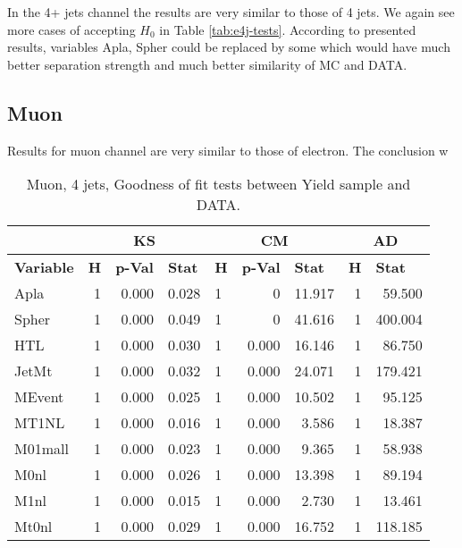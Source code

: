 In the 4+ jets channel the results are very similar to those of 4 jets. We again see more cases of accepting $H_0$ in Table \ref{tab:e4j-tests}. According to presented results, variables \textsf{Apla, Spher} could be replaced by some which would have much better separation strength and much better similarity of MC and DATA. 

\subsection{Muon}

Results for muon channel are very similar to those of electron. The conclusion w

\begin{table}[htbp] \footnotesize
\caption{Muon, 4 jets, Goodness of fit tests between Yield sample and DATA.}
\begin{center}
\begin{tabular}{|l|r|r|r|l|r|r|r|r|}
\hline
 & \multicolumn{ 3}{c|}{\textbf{KS}} & \multicolumn{ 3}{c|}{\textbf{CM}} & \multicolumn{ 2}{c|}{\textbf{AD}} \\ \hline
\textbf{Variable} & \multicolumn{1}{l|}{\textbf{H}} & \multicolumn{1}{l|}{\textbf{p-Val}} & \multicolumn{1}{l|}{\textbf{Stat}} & \multicolumn{1}{l|}{\textbf{H}} & \multicolumn{1}{l|}{\textbf{p-Val}} & \multicolumn{1}{l|}{\textbf{Stat}} & \multicolumn{1}{l|}{\textbf{H}} & \multicolumn{1}{l|}{\textbf{Stat}} \\ \hline
\textsf{Apla} & 1 & 0.000 & 0.028 & 1 & 0 & 11.917 & 1 & 59.500 \\ \hline
\textsf{Spher} & 1 & 0.000 & 0.049 & 1 & 0 & 41.616 & 1 & 400.004 \\ \hline
\textsf{HTL} & 1 & 0.000 & 0.030 & 1 & 0.000 & 16.146 & 1 & 86.750 \\ \hline
\textsf{JetMt} & 1 & 0.000 & 0.032 & 1 & 0.000 & 24.071 & 1 & 179.421 \\ \hline
\textsf{MEvent} & 1 & 0.000 & 0.025 & 1 & 0.000 & 10.502 & 1 & 95.125 \\ \hline
\textsf{MT1NL} & 1 & 0.000 & 0.016 & 1 & 0.000 & 3.586 & 1 & 18.387 \\ \hline
\textsf{M01mall} & 1 & 0.000 & 0.023 & 1 & 0.000 & 9.365 & 1 & 58.938 \\ \hline
\textsf{M0nl} & 1 & 0.000 & 0.026 & 1 & 0.000 & 13.398 & 1 & 89.194 \\ \hline
\textsf{M1nl} & 1 & 0.000 & 0.015 & 1 & 0.000 & 2.730 & 1 & 13.461 \\ \hline
\textsf{Mt0nl} & 1 & 0.000 & 0.029 & 1 & 0.000 & 16.752 & 1 & 118.185 \\ \hline

\end{tabular}
\end{center}
\end{table}
